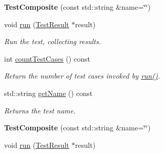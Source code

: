 \begin{DoxyCompactItemize}
\item 
\hypertarget{class_test_composite_adbbbbe065a09b38427a306da6057f48e}{{\bfseries Test\+Composite} (const std\+::string \&name=\char`\"{}\char`\"{})}\label{class_test_composite_adbbbbe065a09b38427a306da6057f48e}

\item 
\hypertarget{class_test_composite_a2ba14045b1a1e83963dd4db746b04dfd}{void \hyperlink{class_test_composite_a2ba14045b1a1e83963dd4db746b04dfd}{run} (\hyperlink{class_test_result}{Test\+Result} $\ast$result)}\label{class_test_composite_a2ba14045b1a1e83963dd4db746b04dfd}

\begin{DoxyCompactList}\small\item\em Run the test, collecting results. \end{DoxyCompactList}\item 
int \hyperlink{class_test_composite_aab3a79f9629eb6f026467e9c27b08788}{count\+Test\+Cases} () const 
\begin{DoxyCompactList}\small\item\em Return the number of test cases invoked by \hyperlink{class_test_composite_a2ba14045b1a1e83963dd4db746b04dfd}{run()}. \end{DoxyCompactList}\item 
std\+::string \hyperlink{class_test_composite_addf2aec7ab7233e433cb5bdf98defb61}{get\+Name} () const 
\begin{DoxyCompactList}\small\item\em Returns the test name. \end{DoxyCompactList}\item 
\hypertarget{class_test_composite_aa82b05d6ca806b023beba504ec9b1d41}{{\bfseries Test\+Composite} (const std\+::string \&name=\char`\"{}\char`\"{})}\label{class_test_composite_aa82b05d6ca806b023beba504ec9b1d41}

\item 
\hypertarget{class_test_composite_a2ba14045b1a1e83963dd4db746b04dfd}{void \hyperlink{class_test_composite_a2ba14045b1a1e83963dd4db746b04dfd}{run} (\hyperlink{class_test_result}{Test\+Result} $\ast$result)}\label{class_test_composite_a2ba14045b1a1e83963dd4db746b04dfd}


\end{DoxyCompactItemize}
